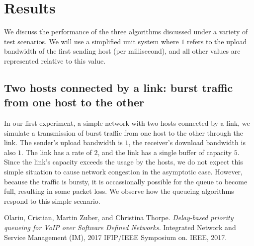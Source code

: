\documentclass[12pt]{article}
\begin{document}
\section{Results}
We discuss the performance of the three algorithms discussed under a variety of test scenarios. We will use a simplified unit system where $1$ refers to the upload bandwidth of the first sending host (per millisecond), and all other values are represented relative to this value. 

\subsection{Two hosts connected by a link: burst traffic from one host to the other}
In our first experiment, a simple network with two hosts connected by a link, we simulate a transmission of burst traffic from one host to the other through the link. The sender's upload bandwidth is $1$, the receiver's download bandwidth is also $1$. The link has a rate of $2$, and the link has a single buffer of capacity $5$. Since the link's capacity exceeds the usage by the hosts, we do not expect this simple situation to cause network congestion in the asymptotic case. However, because the traffic is bursty, it is occassionally possible for the queue to become full, resulting in some packet loss. We observe how the queueing algorithms respond
to this simple scenario.



\begin{thebibliography}{9}


	Olariu, Cristian, Martin Zuber, and Christina Thorpe. \emph{Delay-based priority queueing for VoIP over Software Defined Networks.} Integrated Network and Service Management (IM), 2017 IFIP/IEEE Symposium on. IEEE, 2017.
\end{thebibliography}
\end{document}
